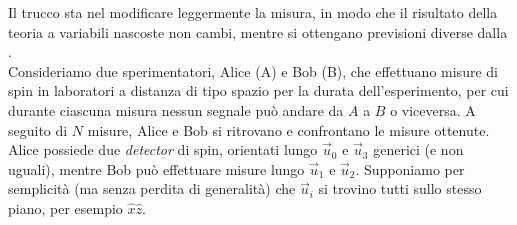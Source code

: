 \documentclass[../../FisicaTeorica.tex]{subfiles}
\begin{document}
Il trucco sta nel modificare leggermente la misura, in modo che il risultato della teoria a variabili nascoste non cambi, mentre si ottengano previsioni diverse dalla \MQ.\\

Consideriamo due sperimentatori, Alice (A) e Bob (B), che effettuano misure di spin in laboratori a distanza di tipo spazio per la durata dell'esperimento, per cui durante ciascuna misura nessun segnale può andare da $A$ a $B$ o viceversa. A seguito di $N$ misure, Alice e Bob si ritrovano e confrontano le misure ottenute.\\

Alice possiede due \textit{detector} di spin, orientati lungo $\vec{u}_0$ e $\vec{u}_3$ generici (e non uguali), mentre Bob può effettuare misure lungo $\vec{u}_1$ e $\vec{u}_2$. Supponiamo per semplicità (ma senza perdita di generalità) che $\vec{u}_i$ si trovino tutti sullo stesso piano, per esempio $\hat{x}\hat{z}$.\\
\end{document}
